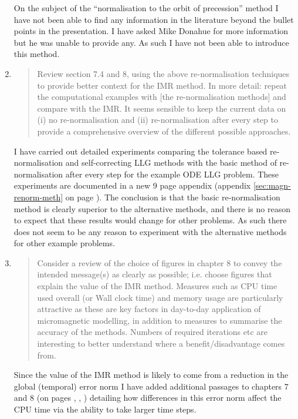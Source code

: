 \documentclass[12pt,a4paper,pdftex]{article}
\begin{document}
\begin{enumerate}
  On the subject of the ``normalisation to the orbit of precession'' method I have not been able to find any information in the literature beyond the bullet points in the presentation.
  I have asked Mike Donahue for more information but he was unable to provide any.
  As such I have not been able to introduce this method.

\item
  \begin{quotation}
    Review section 7.4 and 8, using the above re-normalisation techniques
    to provide better context for the IMR method. In more detail: repeat
    the computational examples with [the re-normalisation methods] and compare with the IMR.
    It seems sensible to keep the current data on (i) no re-normalisation
    and (ii) re-normalisation after every step to provide a comprehensive
    overview of the different possible approaches.
  \end{quotation}
  I have carried out detailed experiments comparing the tolerance based re-normalisation and self-correcting LLG methods with the basic method of re-normalisation after every step for the example ODE LLG problem.
  These experiments are documented in a new 9 page appendix (appendix \ref{sec:magn-renorm-meth} on page \pageref{sec:magn-renorm-meth}).
  The conclusion is that the basic re-normalisation method is clearly superior to the alternative methods, and there is no reason to expect that these results would change for other problems.
  As such there does not seem to be any reason to experiment with the alternative methods for other example problems.

\item
  \begin{quotation}
    Consider a review of the choice of figures in chapter 8 to convey
    the intended message(s) as clearly as possible; i.e. choose figures
    that explain the value of the IMR method. Measures such as CPU time
    used overall (or Wall clock time) and memory usage are particularly
    attractive as these are key factors in day-to-day application of
    micromagnetic modelling, in addition to measures to summarise the
    accuracy of the methods. Numbers of required iterations etc are
    interesting to better understand where a benefit/disadvantage comes
    from.
  \end{quotation}
  Since the value of the IMR method is likely to come from a reduction in the global (temporal) error norm I have added additional passages to chapters 7 and 8 (on pages \pageref{cpu-correction-0}, \pageref{cpu-correction-1}, \pageref{cpu-correction-2}) detailing how differences in this error norm affect the CPU time via the ability to take larger time steps.


\end{enumerate}
\end{document}
